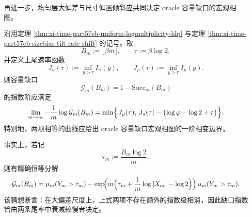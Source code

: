 再进一步，均匀层大偏差与尺寸偏置倾斜应共同决定 oracle 容量缺口的宏观相图。

\begin{conjecture}\label{conj:xi-time-part57eb-oracle-gap-min-envelope-phase-diagram}
沿用定理 \ref{thm:xi-time-part57eb-uniform-logmultiplicity-ldp} 与定理 \ref{thm:xi-time-part57eb-sizebias-tilt-rate-shift} 的记号。取
\[
B_m:=\lfloor \beta m\rfloor,
\qquad
\tau:=\beta\log 2,
\]
并定义上尾速率函数
\[
J_u(\tau):=\inf_{y>\tau}I_u(y),
\qquad
J_\mu(\tau):=\inf_{y>\tau}I_\mu(y).
\]
则容量缺口
\[
\mathcal G_m(B_m)=1-\mathrm{Succ}_m(B_m)
\]
的指数阶应满足
\[
\lim_{m\to\infty}-\frac1m\log \mathcal G_m(B_m)
=
\min\Bigl\{
J_\mu(\tau),\,
J_u(\tau)-\bigl(\log\varphi-\log 2+\tau\bigr)
\Bigr\}.
\]
特别地，两项相等的曲线应给出 oracle 容量缺口宏观相图的一阶相变边界。

事实上，若记
\[
\tau_m:=\frac{B_m\log 2}{m},
\]
则有精确恒等分解
\[
\mathcal G_m(B_m)
=
\mu_m(Y_m>\tau_m)
-\exp\!\Bigl(m\Bigl(\tau_m+\frac1m\log|X_m|-\log 2\Bigr)\Bigr)\,
u_m(Y_m>\tau_m).
\]
该猜想断言：在大偏差尺度上，上式两项不存在额外的指数级相消，因此缺口指数恰由两条尾率中衰减较慢者决定。
\end{conjecture}

\endinput
